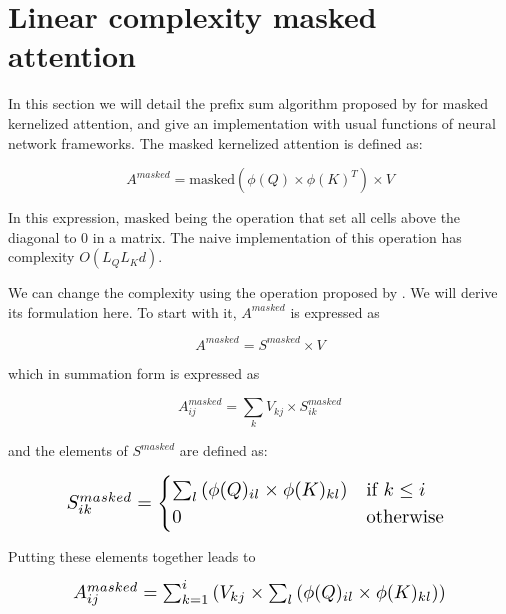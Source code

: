 \section{Linear complexity masked attention}

In this section we will detail the prefix sum algorithm proposed by
\citet{choromanski2021rethinking} for
 masked kernelized attention, and give an implementation with usual
functions of neural network frameworks. The masked kernelized attention is defined as:

\begin{equation}
A^{masked} = \mathrm{masked} \left( \phi(Q) \times \phi(K)^T \right) \times V
\end{equation}

In this expression, $\mathrm{masked}$ being the operation that set all cells
 above the diagonal to 0 in a matrix. The naive implementation of this
 operation has complexity $O(L_QL_Kd)$.

We can change the complexity using the operation proposed by
 \citet{choromanski2021rethinking}. We
 will derive its formulation here.
 To start with it, $A^{masked}$ is expressed as

\begin{equation}
A^{masked} = S^{masked} \times V
\end{equation}

\noindent{}which
in summation form is expressed as

\begin{equation}
A^{masked}_{ij} = \sum_k V_{kj} \times S^{masked}_{ik}
\end{equation}

\noindent{}and the
elements of $S^{masked}$ are defined as:

\begin{equation}
	\resizebox{0.8\hsize}{!}{$
		S^{masked}_{ik} =
		\begin{cases}
		\sum_l \left( \phi(Q)_{il} \times \phi(K)_{kl} \right) & \text{if } k \leq i\\
		0 & \text{otherwise} 
		\end{cases}$
	}
\end{equation}

Putting these elements together leads to

\begin{equation}
	\resizebox{0.8\hsize}{!}{
		$A^{masked}_{ij}= \sum_{k=1}^i \left( V_{kj} \times \sum_l \left( \phi(Q)_{il} \times \phi(K)_{kl} \right) \right)$
	}
\end{equation}

